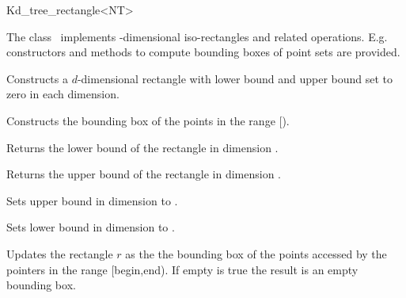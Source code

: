 

\begin{ccRefClass}{Kd_tree_rectangle<NT>}  %


\ccDefinition
  
The class \ccRefName\ implements -dimensional iso-rectangles and related operations.
E.g. constructors and methods to compute bounding boxes of point sets are provided. 



\ccCreation
{}  %


{Constructs a $d$-dimensional rectangle  with lower bound and upper bound set to zero 
in each dimension.}
 
{Constructs the bounding box of the points in the range [).}

\ccOperations

{Returns the lower bound of the rectangle in dimension .}

{Returns the upper bound of the rectangle in dimension .}



{Sets upper bound in dimension  to .}

{Sets lower bound in dimension  to .}
 
{Updates the rectangle $r$ as the the bounding box of the points accessed by the pointers
 in the range [begin,end). If empty is true the result is an empty bounding box.} 
 

\end{ccRefClass}
